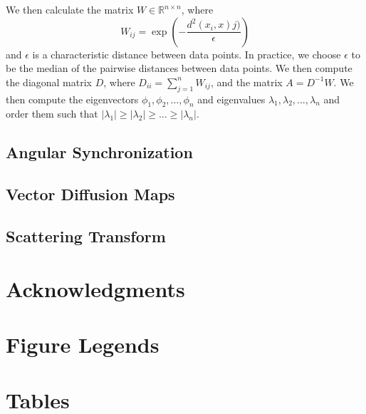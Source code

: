 \documentclass[10pt]{article}
\begin{document}
We then calculate the matrix $W \in \mathbb{R}^{n \times n}$, where 
\begin{equation}
W_{ij} = \exp \left( -\frac{d^2(x_i, x)j)}{\epsilon} \right)
\end{equation}
and $\epsilon$ is a characteristic distance between data points.
%
In practice, we choose $\epsilon$ to be the median of the pairwise distances between data points.
%
We then compute the diagonal matrix $D$, where $D_{ii} = \sum_{j=1}^{n} W_{ij}$, and the matrix $A = D^{-1} W$. 
%
We then compute the eigenvectors $\phi_1, \phi_2, \dots, \phi_n$ and eigenvalues $\lambda_1, \lambda_2, \dots, \lambda_n$ and order them such that $|\lambda_1| \ge |\lambda_2| \ge \dots \ge |\lambda_n|$. 
%


\subsection*{Angular Synchronization}

\subsection*{Vector Diffusion Maps} 

\subsection*{Scattering Transform}

\section*{Acknowledgments}




\section*{Figure Legends}


\section*{Tables}
\end{document}
